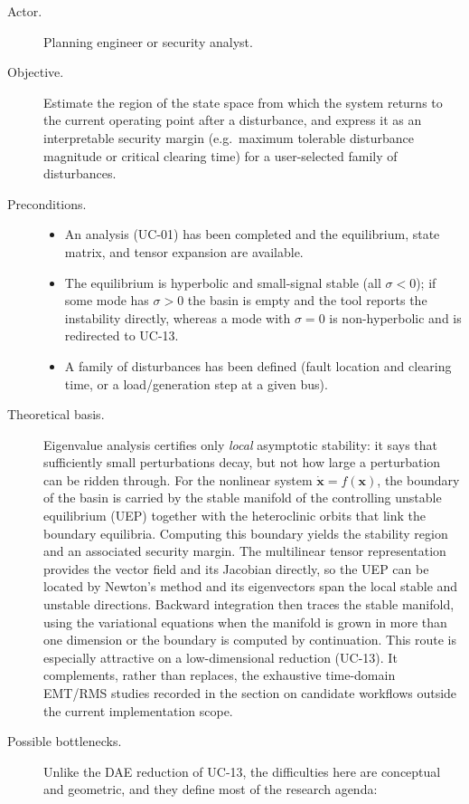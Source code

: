 \begin{description}
  \item[Actor.] Planning engineer or security analyst.
  \item[Objective.] Estimate the region of the state space from which the system returns to the current operating point after a disturbance, and express it as an interpretable security margin (e.g.\ maximum tolerable disturbance magnitude or critical clearing time) for a user-selected family of disturbances.
  \item[Preconditions.]
        \begin{itemize}[before=\leavevmode, leftmargin=*]
          \item An analysis (UC-01) has been completed and the equilibrium, state matrix, and tensor expansion are available.
          \item The equilibrium is hyperbolic and small-signal stable (all $\sigma<0$); if some mode has $\sigma>0$ the basin is empty and the tool reports the instability directly, whereas a mode with $\sigma=0$ is non-hyperbolic and is redirected to UC-13.
          \item A family of disturbances has been defined (fault location and clearing time, or a load/generation step at a given bus).
        \end{itemize}
  \item[Theoretical basis.] Eigenvalue analysis certifies only \emph{local} asymptotic stability: it says that sufficiently small perturbations decay, but not how large a perturbation can be ridden through. For the nonlinear system $\dot{\mathbf{x}}=f(\mathbf{x})$, the boundary of the basin is carried by the stable manifold of the controlling unstable equilibrium (UEP) together with the heteroclinic orbits that link the boundary equilibria. Computing this boundary yields the stability region and an associated security margin. The multilinear tensor representation provides the vector field and its Jacobian directly, so the UEP can be located by Newton's method and its eigenvectors span the local stable and unstable directions. Backward integration then traces the stable manifold, using the variational equations when the manifold is grown in more than one dimension or the boundary is computed by continuation. This route is especially attractive on a low-dimensional reduction (UC-13). It complements, rather than replaces, the exhaustive time-domain EMT/RMS studies recorded in the section on candidate workflows outside the current implementation scope.
  \item[Possible bottlenecks.] Unlike the DAE reduction of UC-13, the difficulties here are conceptual and geometric, and they define most of the research agenda:

\end{description}
